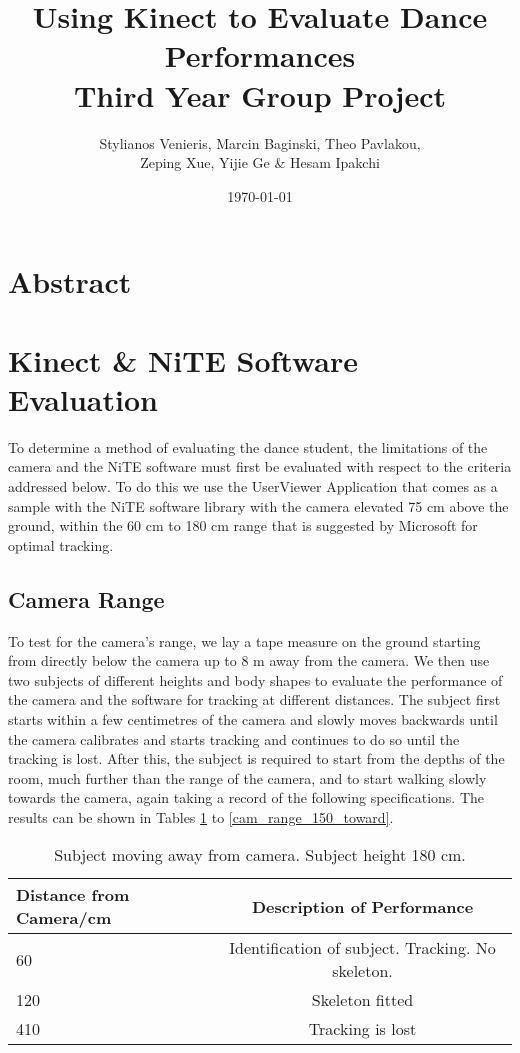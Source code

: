 \documentclass[10pt]{article}
\begin{document}
\title{Using Kinect to Evaluate Dance Performances\\ Third Year Group Project}
\author{Stylianos Venieris, Marcin Baginski, Theo Pavlakou, \\Zeping Xue, Yijie Ge \& Hesam Ipakchi  }
\date{\today}
\maketitle
\newpage

\section*{\center Abstract}

\section{Kinect \& NiTE Software Evaluation}
\noindent
To determine a method of evaluating the dance student, the limitations of the camera and the NiTE software must first be evaluated with respect to the criteria addressed below. To do this we use the UserViewer Application that comes as a sample with the NiTE software library with the camera elevated 75 cm above the ground, within the 60 cm to 180 cm range that is suggested by Microsoft for optimal tracking. 

\subsection{Camera Range}
\noindent 
To test for the camera's range, we lay a tape measure on the ground starting from directly below the camera up to 8 m away from the camera. We then use two subjects of different heights and body shapes to evaluate the performance of the camera and the software for tracking at different distances. The subject first starts within a few centimetres of the camera and slowly moves backwards until the camera calibrates and starts tracking and continues to do so until the tracking is lost. After this, the subject is required to start from the depths of the room, much further than the range of the camera, and to start walking slowly towards the camera, again taking a record of the following specifications. The results can be shown in Tables \ref{cam_range_180_away} to \ref{cam_range_150_toward}.
\\
\begin{table}[h]
\center
\begin{tabular}{ | l | c |}
\hline
Distance from Camera/cm & Description of Performance \\
\hline
60 & Identification of subject. Tracking. No skeleton.\\
120 & Skeleton fitted\\
410 & Tracking is lost\\
\hline
\end{tabular}
\caption{Subject moving away from camera. Subject height 180 cm.}
\label{cam_range_180_away}
\end{table}
\end{document}
